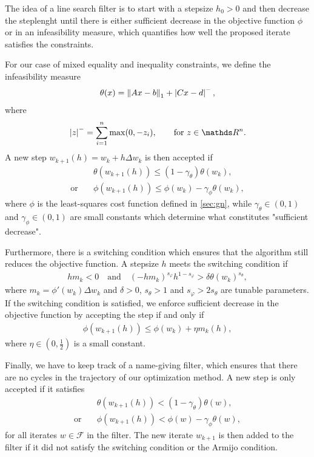 \documentclass{article}
\numberwithin{equation}{section}
\theoremstyle{nonumberplain}
\begin{document}
The idea of a line search filter is to start with a stepsize $h_0 > 0$ and then decrease the steplenght until there is either sufficient decrease in the objective function $\phi$ or in an infeasibility measure, which quantifies how well the proposed iterate satisfies the constraints.

For our case of mixed equality and inequality constraints, we define the infeasibility measure
\begin{align*}
\theta(x) = \left\| Ax-b \right\|_1 + \left| Cx-d \right|^-,
\end{align*}
where 
\begin{align*}
\abs{z}^- = \sum_{i=1}^n \max(0, -z_i), \qquad \text{for } z \in \R^n.
\end{align*}
A new step $w_{k+1}(h) = w_k + h\Delta w_k$ is then accepted if 
\begin{align*}
& \theta(w_{k+1}(h)) \leq (1-\gamma_\theta) \theta(w_k), \\
\text{or} \quad & \phi(w_{k+1}(h)) \leq \phi(w_k) - \gamma_\phi \theta(w_k),
\end{align*}
where $\phi$ is the least-squares cost function defined in \autoref{sec:gn}, while $\gamma_\theta \in (0,1)$ and $\gamma_\phi \in (0,1)$ are small constants which determine what constitutes "sufficient decrease".

Furthermore, there is a switching condition which ensures that the algorithm still reduces the objective function. A stepsize $h$ meets the switching condition if
\begin{align}
h m_k < 0 \quad \text{and} \quad (-h m_k)^{s_\varphi} h^{1-s_\varphi} > \delta \theta(w_k)^{s_\theta}, \label{eq:switching}
\end{align}
where $m_k =\phi'(w_k)\Delta w_k$ and $\delta > 0$, $s_\theta > 1$ and $s_\varphi > 2 s_\theta$ are tunable parameters. If the switching condition is satisfied, we enforce sufficient decrease in the objective function by accepting the step if and only if
\begin{align}
\phi(w_{k+1}(h)) \leq \phi(w_k) + \eta m_k(h), \label{eq:armijo}
\end{align}
where $\eta \in (0,\frac{1}{2})$ is a small constant.

Finally, we have to keep track of a name-giving filter, which ensures that there are no cycles in the trajectory of our optimization method. A new step is only accepted if it satisfies
\begin{align*}
& \theta(w_{k+1}(h)) < (1-\gamma_\theta)\theta(w), \\
\text{or} \quad & \phi(w_{k+1}(h)) < \phi(w) - \gamma_\phi \theta(w),
\end{align*}
for all iterates $w \in \mathcal F$ in the filter. The new iterate $w_{k+1}$ is then added to the filter if it did not satisfy the switching condition or the Armijo condition.
\end{document}
